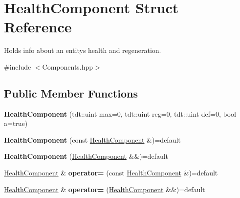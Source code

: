 \hypertarget{struct_health_component}{}\section{Health\+Component Struct Reference}
\label{struct_health_component}


Holds info about an entity\textquotesingle{}s health and regeneration.  




{\ttfamily \#include $<$Components.\+hpp$>$}

\subsection*{Public Member Functions}
\begin{DoxyCompactItemize}
\item 
{\bfseries Health\+Component} (tdt\+::uint max=0, tdt\+::uint reg=0, tdt\+::uint def=0, bool a=true)\hypertarget{struct_health_component_af4adee45342cec889301fa47f34842b2}{}\label{struct_health_component_af4adee45342cec889301fa47f34842b2}

\item 
{\bfseries Health\+Component} (const \hyperlink{struct_health_component}{Health\+Component} \&)=default\hypertarget{struct_health_component_aeb7afb61c37d90d1254d357bf336d6b8}{}\label{struct_health_component_aeb7afb61c37d90d1254d357bf336d6b8}

\item 
{\bfseries Health\+Component} (\hyperlink{struct_health_component}{Health\+Component} \&\&)=default\hypertarget{struct_health_component_a3e7d4b1a7929533fbfba853d1fd75094}{}\label{struct_health_component_a3e7d4b1a7929533fbfba853d1fd75094}

\item 
\hyperlink{struct_health_component}{Health\+Component} \& {\bfseries operator=} (const \hyperlink{struct_health_component}{Health\+Component} \&)=default\hypertarget{struct_health_component_ab46cee5b246fc1f332375ff9eb3d3514}{}\label{struct_health_component_ab46cee5b246fc1f332375ff9eb3d3514}

\item 
\hyperlink{struct_health_component}{Health\+Component} \& {\bfseries operator=} (\hyperlink{struct_health_component}{Health\+Component} \&\&)=default\hypertarget{struct_health_component_a22e43533facb004e79376e6f105f5bfd}{}\label{struct_health_component_a22e43533facb004e79376e6f105f5bfd}

\end{DoxyCompactItemize}
